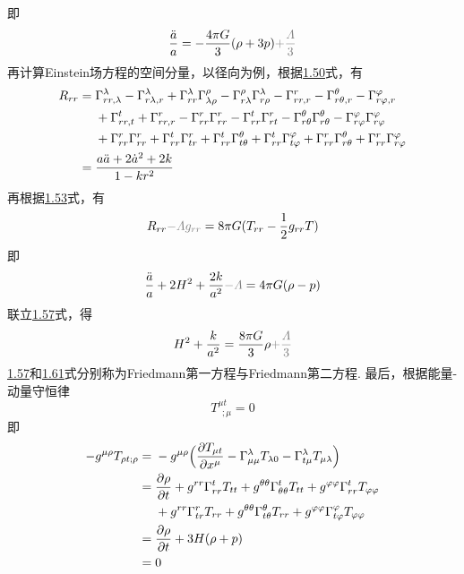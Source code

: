 \documentclass[a4paper]{book}
\begin{document}
即
\begin{equation}\label{1.57}
	\frac{\ddot{a}}{a}=-\frac{4\pi G}{3}(\rho +3p)\textcolor{gray}{+\frac{\varLambda}{3}}
\end{equation}
再计算Einstein场方程的空间分量，以径向为例，根据\hyperref[1.50]{1.50}式，有
\begin{align}
	R_{rr}={}&\Gamma^{\lambda}_{rr,\lambda}-\Gamma^{\lambda}_{r\lambda,r}+\Gamma^{\lambda}_{rr}\Gamma^{\rho}_{\lambda\rho}-\Gamma^{\rho}_{r\lambda}\Gamma^{\lambda}_{r\rho}-\Gamma^{r}_{rr,r}-\Gamma^{\theta}_{r\theta,r}-\Gamma^{\varphi}_{r\varphi,r} \notag \\
	&+\Gamma^{t}_{rr,t}+\Gamma^{r}_{rr,r}-\Gamma^{r}_{rr}\Gamma^{r}_{rr}-\Gamma^{t}_{rr}\Gamma^{r}_{rt}-\Gamma^{\theta}_{r\theta}\Gamma^{\theta}_{r\theta}-\Gamma^{\varphi}_{r\varphi}\Gamma^{\varphi}_{r\varphi} \notag \\
	&+\Gamma^{r}_{rr}\Gamma^{r}_{rr}+\Gamma^{t}_{rr}\Gamma^{r}_{tr}+\Gamma^{t}_{rr}\Gamma^{\theta}_{t\theta}+\Gamma^{t}_{rr}\Gamma^{\varphi}_{t\varphi}+\Gamma^{r}_{rr}\Gamma^{\theta}_{r\theta}+\Gamma^{r}_{rr}\Gamma^{\varphi}_{r\varphi} \notag \\
	={}& \frac{a\ddot{a}+2\dot{a}^2+2k}{1-kr^2}
\end{align}
再根据\hyperref[1.53]{1.53}式，有
\begin{equation}
		R_{rr}\textcolor{gray}{-\varLambda g_{rr}}=8\pi G(T_{rr}-\frac{1}{2}g_{rr}T)
\end{equation}
即
\begin{equation}
	\frac{\ddot{a}}{a}+2H^2+\frac{2k}{a^2}\textcolor{gray}{-\varLambda}=4\pi G(\rho-p)
\end{equation}
联立\hyperref[1.57]{1.57}式，得
\begin{equation}\label{1.61}
	H^2+\frac{k}{a^2}=\frac{8\pi G}{3}\rho \textcolor{gray}{+\frac{\varLambda}{3}}
\end{equation}
\hyperref[1.57]{1.57}和\hyperref[1.61]{1.61}式分别称为Friedmann第一方程与Friedmann第二方程.
最后，根据能量-动量守恒律
\begin{equation}
	T^{\mu t}_{~~;\mu}=0
\end{equation}
即
\begin{align}
	-g^{\mu\rho}T_{\rho t;\rho}={}&-g^{\mu\rho}\Big(\frac{\partial T_{\mu t}}{\partial x^\mu}-\Gamma^{\lambda}_{\mu \mu}T_{\lambda 0}-\Gamma^{\lambda}_{t\mu}T_{\mu \lambda}\Big)\notag \\
	={}& \frac{\partial \rho}{\partial t}+g^{rr}\Gamma^t_{rr}T_{tt}+g^{\theta\theta}\Gamma^t_{\theta\theta}T_{tt}+g^{\varphi\varphi}\Gamma^t_{rr}T_{\varphi\varphi}\notag \\
	&+g^{rr}\Gamma^r_{tr}T_{rr}+g^{\theta\theta}\Gamma^\theta_{t\theta}T_{rr}+g^{\varphi\varphi}\Gamma^\varphi_{t\varphi}T_{\varphi\varphi} \notag \\
	={}&\frac{\partial \rho}{\partial t}+3H(\rho+p) \notag \\
	={}& 0 \notag
\end{align}
\end{document}
